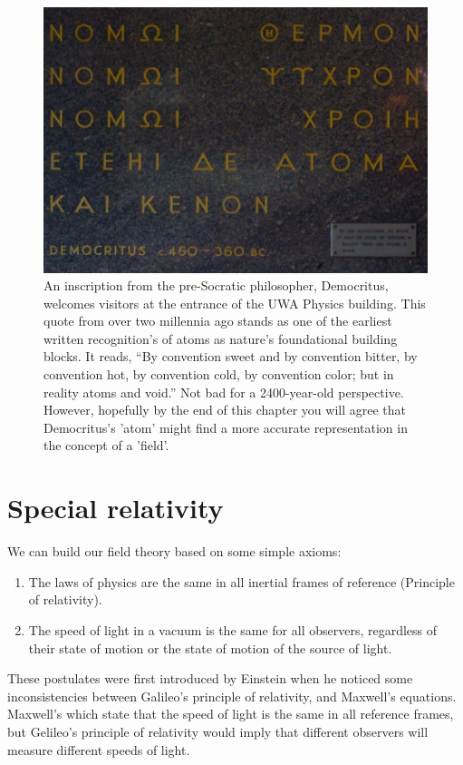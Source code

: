 \begin{figure}
    \centering
    \includegraphics{Chapter_2/Figs ch2/democritus.png}
    \caption{An inscription from the pre-Socratic philosopher, Democritus, welcomes visitors at the entrance of the UWA Physics building. This quote from over two millennia ago stands as one of the earliest written recognition's of atoms as nature's foundational building blocks. It reads, “By convention sweet and by convention bitter, by convention hot, by convention cold, by convention color; but in reality atoms and void.” Not bad for a 2400-year-old perspective. However, hopefully by the end of this chapter you will agree that Democritus's 'atom' might find a more accurate representation in the concept of a 'field'.}
    \label{fig:democritus}
\end{figure}

\section{Special relativity}

We can build our field theory based on some simple axioms:
\begin{enumerate}
    \item The laws of physics are the same in all inertial frames of reference (Principle of relativity).
    \item The speed of light in a vacuum is the same for all observers, regardless of their state of motion or the state of motion of the source of light.
\end{enumerate}

These postulates were first introduced by Einstein when he noticed some inconsistencies between Galileo's principle of relativity, and Maxwell's equations.  Maxwell's which state that the speed of light is the same in all reference frames, but Gelileo's principle of relativity would imply that different observers will measure different speeds of light.

